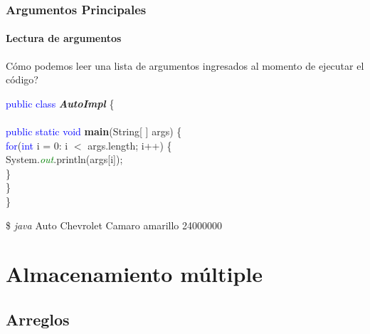\documentclass{beamer}
\begin{document}
		\begin{frame}
			\frametitle{Argumentos Principales}
			\framesubtitle{Lectura de argumentos}

			\begin{block}{}
			    {\scriptsize
                    \textquestiondown C\'omo podemos leer una lista de argumentos ingresados al momento de ejecutar el c\'odigo?
			    }
			\end{block}
			\begin{block}{}
				{\scriptsize
				\textcolor{blue}{public class} \textbf{\emph{AutoImpl}} \{ \\
				\hspace{1cm} \\
				\hspace{1cm} \textcolor{blue}{public static void} \textbf{main}(String[ ] args) \{ \\
				\hspace{2cm} \textcolor{blue}{for}(\textcolor{blue}{int} i = 0: i $<$ args.length; i++) \{ \\
				\hspace{3cm} System.\emph{\textcolor{green}{out}}.println(args[i]);\\
				\hspace{2cm} \} \\
				\hspace{1cm} \} \\
				\}}
			\end{block}
			\begin{block}{}
			    {\scriptsize
                    \$ \emph{java} Auto Chevrolet Camaro amarillo 24000000
			    }
			\end{block}
		\end{frame}

	\section{Almacenamiento m\'ultiple}

		\subsection{Arreglos}
\end{document}
